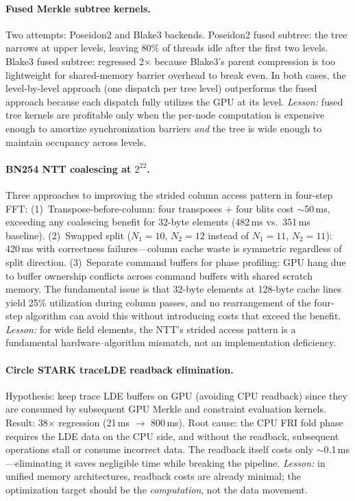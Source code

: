 \paragraph{Fused Merkle subtree kernels.}
Two attempts: Poseidon2 and Blake3 backends.
Poseidon2 fused subtree: the tree narrows at upper levels, leaving 80\% of threads idle after the first two levels.
Blake3 fused subtree: regressed 2$\times$ because Blake3's parent compression is too lightweight for shared-memory barrier overhead to break even.
In both cases, the level-by-level approach (one dispatch per tree level) outperforms the fused approach because each dispatch fully utilizes the GPU at its level.
\emph{Lesson:} fused tree kernels are profitable only when the per-node computation is expensive enough to amortize synchronization barriers \emph{and} the tree is wide enough to maintain occupancy across levels.

\paragraph{BN254 NTT coalescing at $2^{22}$.}
Three approaches to improving the strided column access pattern in four-step FFT:
(1)~Transpose-before-column: four transposes + four blits cost $\sim$50\,ms, exceeding any coalescing benefit for 32-byte elements (482\,ms vs.\ 351\,ms baseline).
(2)~Swapped split ($N_1=10$, $N_2=12$ instead of $N_1=11$, $N_2=11$): 420\,ms with correctness failures---column cache waste is symmetric regardless of split direction.
(3)~Separate command buffers for phase profiling: GPU hang due to buffer ownership conflicts across command buffers with shared scratch memory.
The fundamental issue is that 32-byte elements at 128-byte cache lines yield 25\% utilization during column passes, and no rearrangement of the four-step algorithm can avoid this without introducing costs that exceed the benefit.
\emph{Lesson:} for wide field elements, the NTT's strided access pattern is a fundamental hardware--algorithm mismatch, not an implementation deficiency.

\paragraph{Circle STARK traceLDE readback elimination.}
Hypothesis: keep trace LDE buffers on GPU (avoiding CPU readback) since they are consumed by subsequent GPU Merkle and constraint evaluation kernels.
Result: 38$\times$ regression (21\,ms $\to$ 800\,ms).
Root cause: the CPU FRI fold phase requires the LDE data on the CPU side, and without the readback, subsequent operations stall or consume incorrect data.
The readback itself costs only $\sim$0.1\,ms---eliminating it saves negligible time while breaking the pipeline.
\emph{Lesson:} in unified memory architectures, readback costs are already minimal; the optimization target should be the \emph{computation}, not the data movement.

